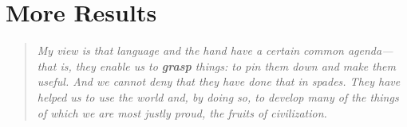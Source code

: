 \documentclass[../main.tex]{subfiles}
\begin{document}
\chapter{More Results}\label{chap:more_results}

\bigskip
\begin{quote}
  \emph{My view is that language and the hand have a certain common agenda--- that is, they enable us to \textbf{grasp} things: to pin them down and make them useful. And we cannot deny that they have done that in spades. They have helped us to use the world and, by doing so, to develop many of the things of which we are most justly proud, the fruits of civilization.}
  
\end{quote}

\cleardoublepage%









\end{document}
